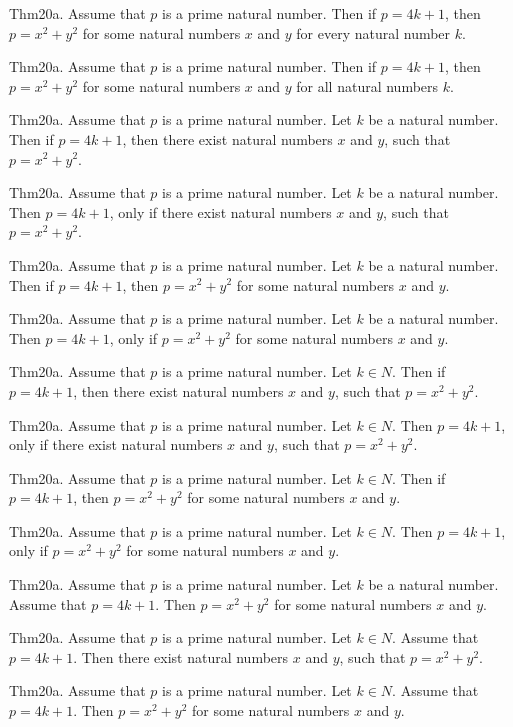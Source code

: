 \documentclass{article}
\begin{document}
Thm20a. Assume that $p$ is a prime natural number. Then if $p = 4 k + 1$, then $p = x ^{ 2}+ y ^{ 2}$ for some natural numbers $x$ and $y$ for every natural number $k$.

Thm20a. Assume that $p$ is a prime natural number. Then if $p = 4 k + 1$, then $p = x ^{ 2}+ y ^{ 2}$ for some natural numbers $x$ and $y$ for all natural numbers $k$.

Thm20a. Assume that $p$ is a prime natural number. Let $k$ be a natural number. Then if $p = 4 k + 1$, then there exist natural numbers $x$ and $y$, such that $p = x ^{ 2}+ y ^{ 2}$.

Thm20a. Assume that $p$ is a prime natural number. Let $k$ be a natural number. Then $p = 4 k + 1$, only if there exist natural numbers $x$ and $y$, such that $p = x ^{ 2}+ y ^{ 2}$.

Thm20a. Assume that $p$ is a prime natural number. Let $k$ be a natural number. Then if $p = 4 k + 1$, then $p = x ^{ 2}+ y ^{ 2}$ for some natural numbers $x$ and $y$.

Thm20a. Assume that $p$ is a prime natural number. Let $k$ be a natural number. Then $p = 4 k + 1$, only if $p = x ^{ 2}+ y ^{ 2}$ for some natural numbers $x$ and $y$.

Thm20a. Assume that $p$ is a prime natural number. Let $k \in N$. Then if $p = 4 k + 1$, then there exist natural numbers $x$ and $y$, such that $p = x ^{ 2}+ y ^{ 2}$.

Thm20a. Assume that $p$ is a prime natural number. Let $k \in N$. Then $p = 4 k + 1$, only if there exist natural numbers $x$ and $y$, such that $p = x ^{ 2}+ y ^{ 2}$.

Thm20a. Assume that $p$ is a prime natural number. Let $k \in N$. Then if $p = 4 k + 1$, then $p = x ^{ 2}+ y ^{ 2}$ for some natural numbers $x$ and $y$.

Thm20a. Assume that $p$ is a prime natural number. Let $k \in N$. Then $p = 4 k + 1$, only if $p = x ^{ 2}+ y ^{ 2}$ for some natural numbers $x$ and $y$.

Thm20a. Assume that $p$ is a prime natural number. Let $k$ be a natural number. Assume that $p = 4 k + 1$. Then $p = x ^{ 2}+ y ^{ 2}$ for some natural numbers $x$ and $y$.

Thm20a. Assume that $p$ is a prime natural number. Let $k \in N$. Assume that $p = 4 k + 1$. Then there exist natural numbers $x$ and $y$, such that $p = x ^{ 2}+ y ^{ 2}$.

Thm20a. Assume that $p$ is a prime natural number. Let $k \in N$. Assume that $p = 4 k + 1$. Then $p = x ^{ 2}+ y ^{ 2}$ for some natural numbers $x$ and $y$.
\end{document}
